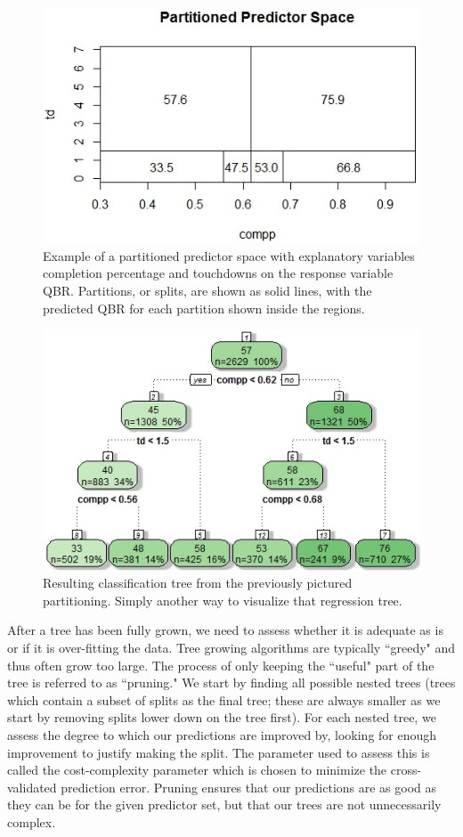 \documentclass[12pt]{article}\usepackage[]{graphicx}\usepackage[]{color}
\begin{document}
\begin{figure}[h]
\centering
\includegraphics[width=.6\textwidth]{expartspace.jpeg}
\captionsetup{font=footnotesize,labelfont=footnotesize}
\caption{\label{fig:part} Example of a partitioned predictor space with explanatory variables completion percentage and touchdowns on the response variable QBR. Partitions, or splits, are shown as solid lines, with the predicted QBR for each partition shown inside the regions.}
\end{figure}

\begin{figure}[h]
\centering
\includegraphics[width=.6\textwidth]{extree.jpeg}
\captionsetup{font=footnotesize,labelfont=footnotesize}
\caption{\label{fig:ex} Resulting classification tree from the previously pictured partitioning. Simply another way to visualize that regression tree.}
\end{figure}

\newpage
After a tree has been fully grown, we need to assess whether it is adequate as is or if it is over-fitting the data. Tree growing algorithms are typically ``greedy" and thus often grow too large. The process of only keeping the ``useful" part of the tree is referred to as ``pruning." We start by finding all possible nested trees (trees which contain a subset of splits as the final tree; these are always smaller as we start by removing splits lower down on the tree first). For each nested tree, we assess the degree to which our predictions are improved by, looking for enough improvement to justify making the split. The parameter used to assess this is called the cost-complexity parameter which is chosen to minimize the cross-validated prediction error. Pruning ensures that our predictions are as good as they can be for the given predictor set, but that our trees are not unnecessarily complex.
\end{document}
